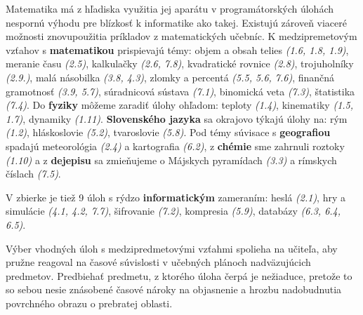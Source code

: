 Matematika má z hľadiska využitia jej aparátu v programátorských úlohách nespornú výhodu pre blízkosť k informatike ako takej. Existujú zároveň viaceré možnosti znovupoužitia príkladov z matematických učebníc. K medzipremetovým vzťahov s \textbf{matematikou} prispievajú témy:
objem a obsah telies \emph{(1.6, 1.8, 1.9)}, meranie času \emph{(2.5)}, kalkulačky \emph{(2.6, 7.8)}, kvadratické rovnice \emph{(2.8)}, trojuholníky \emph{(2.9.)}, malá násobilka \emph{(3.8, 4.3)}, zlomky a percentá \emph{(5.5, 5.6, 7.6)}, finančná gramotnosť \emph{(3.9, 5.7)}, súradnicová sústava \emph{(7.1)}, binomická veta \emph{(7.3)}, štatistika \emph{(7.4)}. Do \textbf{fyziky} môžeme zaradiť úlohy ohľadom: teploty \emph{(1.4)}, kinematiky \emph{(1.5, 1.7)}, dynamiky \emph{(1.11)}. \textbf{Slovenského jazyka} sa okrajovo týkajú úlohy na: rým \emph{(1.2)}, hláskoslovie \emph{(5.2)}, tvaroslovie \emph{(5.8)}. Pod témy súvisace s \textbf{geografiou} spadajú meteorológia \emph{(2.4)} a kartografia \emph{(6.2)}, z \textbf{chémie} sme zahrnuli roztoky \emph{(1.10)} a z \textbf{dejepisu} sa zmieňujeme o Májskych pyramídach \emph{(3.3)} a rímskych číslach \emph{(7.5)}.

V zbierke je tiež 9 úloh s rýdzo \textbf{informatickým} zameraním: heslá \emph{(2.1)}, hry a simulácie \emph{(4.1, 4.2, 7.7)}, šifrovanie \emph{(7.2)}, kompresia \emph{(5.9)}, databázy \emph{(6.3, 6.4, 6.5)}.

Výber vhodných úloh s medzipredmetovými vzťahmi spolieha na učiteľa, aby pružne reagoval na časové súvislosti v učebných plánoch nadväzujúcich predmetov. Predbiehať predmetu, z ktorého úloha čerpá je nežiaduce, pretože to so sebou nesie znásobené časové nároky na objasnenie a hrozbu nadobudnutia povrchného obrazu o prebratej oblasti.
